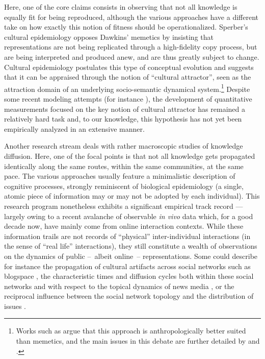 Here, one of the core claims consists in observing that not all knowledge is equally fit for being reproduced, although the various approaches have a different take on how exactly this notion of fitness should be operationalized. Sperber's cultural epidemiology opposes Dawkins' memetics by insisting that representations are not being replicated through a high-fidelity copy process, but are being interpreted and produced anew, and are thus greatly subject to change.
Cultural epidemiology postulates this type of conceptual evolution and suggests that it can be appraised through the notion of ``cultural attractor'', seen as the attraction domain of an underlying socio-semantic dynamical system.\footnote{Works such as \citet{Atran03} argue that this approach is anthropologically better suited than memetics, and the main issues in this debate are further detailed by \citet{Kuper00} and \citet{Bloch00}.}
Despite some recent modeling attempts (for instance \citet{Claidiere07}), the development of quantitative measurements focused on the key notion of cultural attractor has remained a relatively hard task and, to our knowledge, this hypothesis has not yet been empirically analyzed in an extensive manner.


Another research stream deals with rather macroscopic studies of knowledge diffusion. Here, one of the focal points is that not all knowledge gets propagated identically along the same routes, within the same communities, at the same pace. The various approaches usually feature a minimalistic description of cognitive processes, strongly reminiscent of biological epidemiology (a single, atomic piece of information may or may not be adopted by each individual).  
This research program nonetheless exhibits a significant empirical track record --- largely owing to a recent avalanche of observable \emph{in vivo} data which, for a good decade now, have mainly come from online interaction contexts.
While these information trails are not records of ``physical'' inter-individual interactions (in the sense of ``real life'' interactions), they still constitute a wealth of observations on the dynamics of public --~albeit online~-- representations.
Some could describe for instance the propagation of cultural artifacts across social networks such as blogspace \citep{Gruhl04}, the characteristic times and diffusion cycles both within these social networks and with respect to the topical dynamics of news media \citep{Leskovec09}, or the reciprocal influence between the social network topology and the distribution of issues \citep{Cointet09}.

